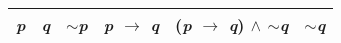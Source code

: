 \documentclass{article}
\begin{document}
\begin{itemize}
    \begin{center}
        \begin{tabular}{|c|c|c|c|c|c|}
            \hline
            \emph{p} & \emph{q} & $\sim$\emph{p} & \emph{p} $\to$ \emph{q} & (\emph{p} $\to$ \emph{q}) $\wedge$ $\sim$\emph{q} & $\sim$\emph{q}\\
            \hline
        \end{tabular}
    \end{center}

\end{itemize}
\end{document}
